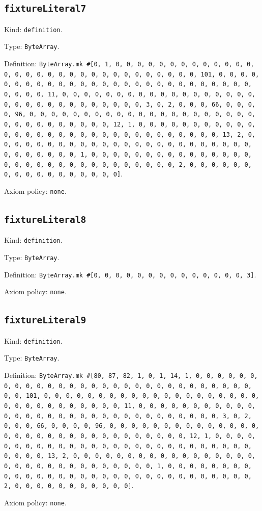 \documentclass[11pt]{article}
\begin{document}
\subsection*{\texttt{fixtureLiteral7}}
\noindent Kind: \texttt{definition}.\par
\noindent Type: \texttt{ByteArray}.\par
\noindent Definition: \texttt{ByteArray.mk \#[0, 1, 0, 0, 0, 0, 0, 0, 0, 0, 0, 0, 0, 0, 0, 0, 0, 0, 0, 0, 0, 0, 0, 0, 0, 0, 0, 0, 0, 0, 0, 0, 0, 101, 0, 0, 0, 0, 0, 0, 0, 0, 0, 0, 0, 0, 0, 0, 0, 0, 0, 0, 0, 0, 0, 0, 0, 0, 0, 0, 0, 0, 0, 0, 0, 11, 0, 0, 0, 0, 0, 0, 0, 0, 0, 0, 0, 0, 0, 0, 0, 0, 0, 0, 0, 0, 0, 0, 0, 0, 0, 0, 0, 0, 0, 0, 0, 3, 0, 2, 0, 0, 0, 66, 0, 0, 0, 0, 96, 0, 0, 0, 0, 0, 0, 0, 0, 0, 0, 0, 0, 0, 0, 0, 0, 0, 0, 0, 0, 0, 0, 0, 0, 0, 0, 0, 0, 0, 0, 0, 12, 1, 0, 0, 0, 0, 0, 0, 0, 0, 0, 0, 0, 0, 0, 0, 0, 0, 0, 0, 0, 0, 0, 0, 0, 0, 0, 0, 0, 0, 0, 0, 0, 13, 2, 0, 0, 0, 0, 0, 0, 0, 0, 0, 0, 0, 0, 0, 0, 0, 0, 0, 0, 0, 0, 0, 0, 0, 0, 0, 0, 0, 0, 0, 0, 0, 1, 0, 0, 0, 0, 0, 0, 0, 0, 0, 0, 0, 0, 0, 0, 0, 0, 0, 0, 0, 0, 0, 0, 0, 0, 0, 0, 0, 0, 0, 0, 0, 2, 0, 0, 0, 0, 0, 0, 0, 0, 0, 0, 0, 0, 0, 0, 0, 0, 0]}.\par
\noindent Axiom policy: \texttt{none}.\par
\subsection*{\texttt{fixtureLiteral8}}
\noindent Kind: \texttt{definition}.\par
\noindent Type: \texttt{ByteArray}.\par
\noindent Definition: \texttt{ByteArray.mk \#[0, 0, 0, 0, 0, 0, 0, 0, 0, 0, 0, 0, 0, 0, 3]}.\par
\noindent Axiom policy: \texttt{none}.\par
\subsection*{\texttt{fixtureLiteral9}}
\noindent Kind: \texttt{definition}.\par
\noindent Type: \texttt{ByteArray}.\par
\noindent Definition: \texttt{ByteArray.mk \#[80, 87, 82, 1, 0, 1, 14, 1, 0, 0, 0, 0, 0, 0, 0, 0, 0, 0, 0, 0, 0, 0, 0, 0, 0, 0, 0, 0, 0, 0, 0, 0, 0, 0, 0, 0, 0, 0, 0, 101, 0, 0, 0, 0, 0, 0, 0, 0, 0, 0, 0, 0, 0, 0, 0, 0, 0, 0, 0, 0, 0, 0, 0, 0, 0, 0, 0, 0, 0, 0, 0, 11, 0, 0, 0, 0, 0, 0, 0, 0, 0, 0, 0, 0, 0, 0, 0, 0, 0, 0, 0, 0, 0, 0, 0, 0, 0, 0, 0, 0, 0, 0, 0, 3, 0, 2, 0, 0, 0, 66, 0, 0, 0, 0, 96, 0, 0, 0, 0, 0, 0, 0, 0, 0, 0, 0, 0, 0, 0, 0, 0, 0, 0, 0, 0, 0, 0, 0, 0, 0, 0, 0, 0, 0, 0, 0, 12, 1, 0, 0, 0, 0, 0, 0, 0, 0, 0, 0, 0, 0, 0, 0, 0, 0, 0, 0, 0, 0, 0, 0, 0, 0, 0, 0, 0, 0, 0, 0, 0, 13, 2, 0, 0, 0, 0, 0, 0, 0, 0, 0, 0, 0, 0, 0, 0, 0, 0, 0, 0, 0, 0, 0, 0, 0, 0, 0, 0, 0, 0, 0, 0, 0, 1, 0, 0, 0, 0, 0, 0, 0, 0, 0, 0, 0, 0, 0, 0, 0, 0, 0, 0, 0, 0, 0, 0, 0, 0, 0, 0, 0, 0, 0, 0, 0, 2, 0, 0, 0, 0, 0, 0, 0, 0, 0, 0, 0]}.\par
\noindent Axiom policy: \texttt{none}.\par
\end{document}
